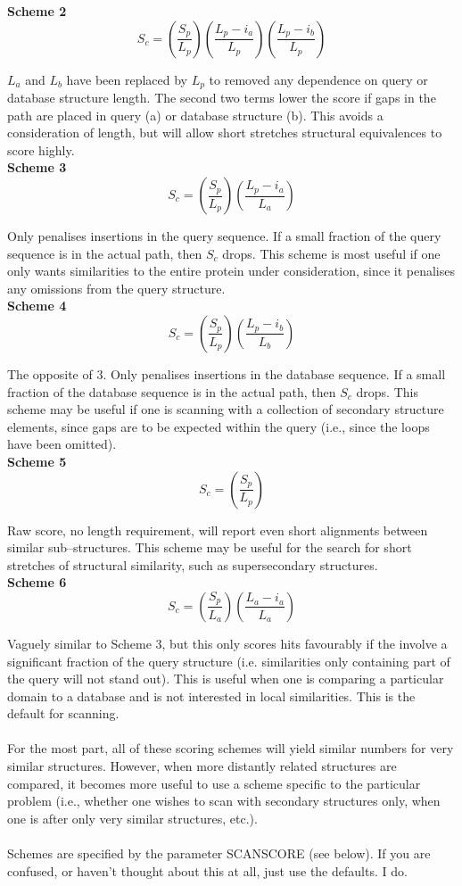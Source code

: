 {\bf Scheme 2}\\
\[
S_{c} =
\left(
\frac{S_{p}}{L_{p}}
\right)
\left(
\frac{L_{p}-i_{a}}{L_{p}}
\right)
\left(
\frac{L_{p}-i_{b}}{L_{p}}
\right)
\]

$L_{a}$ and $L_{b}$ have been replaced by $L_{p}$ to removed any dependence
on query or database structure length.  The second two terms
lower the score if gaps in the path are placed in query (a) or 
database structure (b).  This avoids a consideration of length, but will
allow short stretches structural equivalences to score highly.\\

{\bf Scheme 3}
\[
S_{c} =
\left(
\frac{S_{p}}{L_{p}}
\right)
\left(
\frac{L_{p}-i_{a}}{L_{a}}
\right)
\]


Only penalises insertions in the query sequence.  If a small
fraction of the query sequence is in the actual path, then
$S_{c}$ drops.  
This scheme is most useful if one only wants similarities
to the entire protein under consideration, since it penalises
any omissions from the query structure.\\

{\bf Scheme 4}
\[
S_{c} =
\left(
\frac{S_{p}}{L_{p}}
\right)
\left(
\frac{L_{p}-i_{b}}{L_{b}}
\right)
\]

The opposite of 3.  Only penalises insertions in the database sequence.  
If a small fraction of the database sequence is in the actual path, then $S_{c}$ 
drops.  This scheme may be useful if one is scanning with a collection of
secondary structure elements, since gaps are to be expected within the 
query (i.e., since the loops have been omitted).\\


{\bf Scheme 5}
\[
S_{c} =
\left(
\frac{S_{p}}{L_{p}}
\right)
\]

Raw score, no length requirement, will report even short alignments between
similar sub--structures.  This scheme may be useful for the search for
short stretches of structural similarity, such as supersecondary structures.\\

{\bf Scheme 6}
\[
S_{c} =
\left(
\frac{S_{p}}{L_{a}}
\right)
\left(
\frac{L_{a}-i_{a}}{L_{a}}
\right)
\]

Vaguely similar to Scheme 3, but this only scores hits favourably
if the involve a significant fraction of the query structure
(i.e. similarities only containing part of the query will not
stand out).  This is useful when one is comparing a particular
domain to a database and is not interested in local similarities.
This is the default for scanning.\\
\\
For the most part, all of these scoring schemes will yield similar
numbers for very similar structures.  However, when more distantly
related structures are compared, it becomes more useful to use a
scheme specific to the particular problem (i.e., whether one wishes
to scan with secondary structures only, when one is after only
very similar structures, etc.).\\
\\
Schemes are specified by the parameter SCANSCORE (see below).  If 
you are confused, or haven't thought about this at all, just use the 
defaults.  I do.

